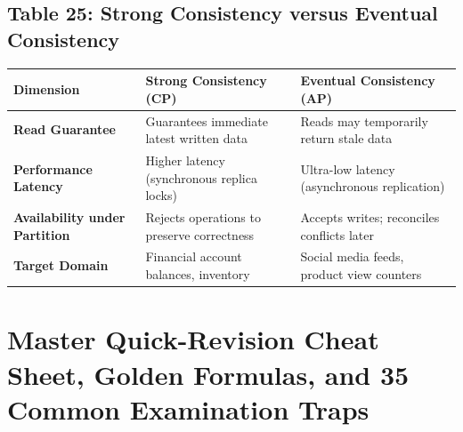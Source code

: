 \subsection*{Table 25: Strong Consistency versus Eventual Consistency}
\begin{center}
\small
\begin{tabularx}{\textwidth}{lXX}
\toprule
\textbf{Dimension} & \textbf{Strong Consistency (CP)} & \textbf{Eventual Consistency (AP)} \\
\midrule
\textbf{Read Guarantee} & Guarantees immediate latest written data & Reads may temporarily return stale data \\
\textbf{Performance Latency} & Higher latency (synchronous replica locks) & Ultra-low latency (asynchronous replication) \\
\textbf{Availability under Partition} & Rejects operations to preserve correctness & Accepts writes; reconciles conflicts later \\
\textbf{Target Domain} & Financial account balances, inventory & Social media feeds, product view counters \\
\bottomrule
\end{tabularx}
\end{center}


\section{Master Quick-Revision Cheat Sheet, Golden Formulas, and 35 Common Examination Traps}
\label{sec:cloud_ml_cheat_sheet_and_traps}

